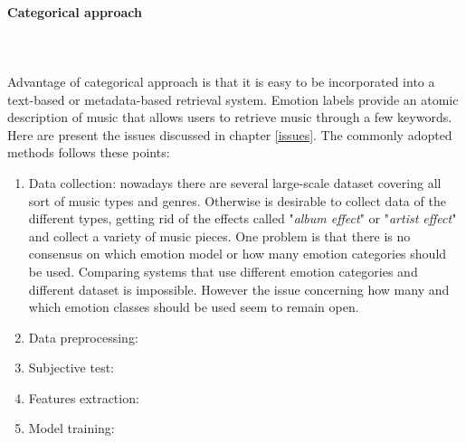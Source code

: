\paragraph{Categorical approach}
\mbox{} \\ \\ \indent
Advantage of categorical approach is that it is easy to be incorporated into a text-based or metadata-based retrieval system. Emotion labels provide an atomic description of music that allows users to retrieve music through a few keywords. Here are present the issues discussed in chapter \ref{issues}.
The commonly adopted methods follows these points:
\begin{enumerate}
	\item Data collection: nowadays there are several large-scale dataset covering all sort of music types and genres. Otherwise is desirable to collect data of the different types, getting rid of the effects called "\textit{album effect}" or "\textit{artist effect}" and collect a variety of music pieces. One problem is that there is no consensus on which emotion model or how many emotion categories should be used. Comparing systems that use different emotion categories  and different dataset is impossible. However the issue concerning how many and which emotion classes should be used seem to remain open.
	\item Data preprocessing:
	\item Subjective test:
	\item Features extraction:
	\item Model training:
\end{enumerate}








